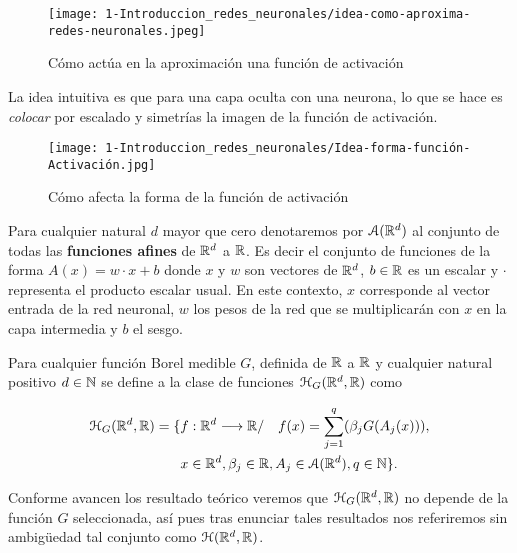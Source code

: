 \begin{figure}[h!]
    \texttt{[image: 1-Introduccion\_redes\_neuronales/idea-como-aproxima-redes-neuronales.jpeg]}
    \caption{Cómo actúa en la aproximación una función de activación}
    \label{img:idea-como-aproxima-redes-neuronales}
   \end{figure}

La idea intuitiva es que para una capa oculta con una neurona, 
lo que se hace es \textit{colocar} por escalado y simetrías la imagen de la función de activación. 

\begin{figure}[h!]
    \texttt{[image: 1-Introduccion\_redes\_neuronales/Idea-forma-función-Activación.jpg]}
    \caption{Cómo afecta la forma de la función de activación}
    \label{img:como afecta la forma de la función de aproximación}
\end{figure}


Para cualquier natural $d$ mayor que cero  denotaremos por $\mathcal{A}(\mathbb{R}^d)$ al conjunto de todas 
las \textbf{funciones afines} de $\mathbb{R}^d$ a $\mathbb{R}$. Es decir el conjunto de funciones de la forma 
$A(x) = w \cdot x + b$ donde $x$ y $w$ son vectores de $\mathbb{R}^d$,  $b \in \mathbb{R}$ es un escalar
 y $\cdot$ representa el producto escalar
usual. En este contexto, $x$ corresponde al vector entrada de la red neuronal, $w$ los pesos de la red
que se multiplicarán con $x$ en la capa intermedia y $b$ el sesgo. 

\begin{definicion} 
    Para cualquier función Borel medible $G$, definida de $\mathbb{R}$ a $\mathbb{R}$ y cualquier natural positivo
    $d \in \mathbb{N}$ se define a la clase de funciones $\mathcal{H}_G(\mathbb{R}^d,\mathbb{R})$ como 

    \begin{equation}
        \begin{split}
        \mathcal{H}_G(\mathbb{R}^d,\mathbb{R}) = 
        \{ 
            & f: \mathbb{R} ^d \longrightarrow \mathbb{R} / \quad
            f(x)=\sum_{j = 1} ^q (
            \beta_j G(A_{j}(x))), \\
            & x  \in \mathbb{R} ^d, \beta_j \in \mathbb{R}, A_{j}\in \mathcal{A}(\mathbb{R}^d),q \in \mathbb{N}
        \}.
        \end{split}
    \end{equation}

    Conforme avancen los resultado teórico veremos que $\mathcal{H}_G(\mathbb{R}^d,\mathbb{R})$ 
    no depende de la función $G$ seleccionada, así pues tras enunciar tales resultados nos referiremos sin ambigüedad tal conjunto como $\mathcal{H}(\mathbb{R}^d,\mathbb{R})$.
\end{definicion}



